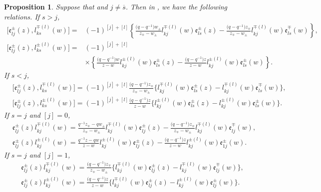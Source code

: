 \documentclass[10pt,a4paper]{amsart}
\numberwithin{equation}{section}
\newtheorem{Proposition}[Theorem]{Proposition}
 { \theoremstyle{definition}
\newtheorem{Definition}[Theorem]{Definition}
\newtheorem{Note}[Theorem]{Note}
\newtheorem{Example}[Theorem]{Example}
\newtheorem{Remark}[Theorem]{Remark} }
\begin{document}
\begin{Proposition}\label{pr3}
Suppose that  and $j\neq \overline{s}$. Then in , we have the following relations.
If $s>j$,
\begin{align}
\bigl[\mathfrak{e}_{lj}^{\pm}(z), l_{ks}^{\mp(l)}(w)\bigr]={}&(-1)^{[j]+[l]}\left\{\frac{\bigl(q-q^{-1}\bigr)w_{\pm}}{z_{\mp}-w_{\pm}}l_{kj}^{\mp(l)}(w)\mathfrak{e}_{ls}^{\pm}(z) -\frac{\bigl(q-q^{-1}\bigr)z_{\mp}}{z_{\mp}-w_{\pm}}l_{kj}^{\mp(l)}(w)\mathfrak{e}_{ls}^{\mp}(w)\right\},\nonumber\\
\bigl[\mathfrak{e}_{lj}^{\pm}(z), l_{ks}^{\pm(l)}(w)\bigr]={}&(-1)^{[j]+[l]}\nonumber\\
&\times\left\{\frac{\bigl(q-q^{-1}\bigr)w}{z-w}l_{kj}^{\pm(l)}(w)\mathfrak{e}_{ls}^{\pm}(z) -\frac{\bigl(q-q^{-1}\bigr)z}{z-w}l_{kj}^{\pm(l)}(w)\mathfrak{e}_{ls}^{\pm}(w)\right\}.\label{GS9}
\end{align}
If $s<j$,
\begin{align*}%
 &\bigl[\mathfrak{e}_{lj}^{\pm}(z), l_{ks}^{\mp(l)}(w)\bigr]=(-1)^{[j]+[l]}\frac{\bigl(q-q^{-1}\bigr)z_{\mp}}{z_{\mp}-w_{\pm}}\bigl\{l_{kj}^{\mp(l)}(w)\mathfrak{e}_{ls}^{\pm}(z) -l_{kj}^{\mp(l)}(w)\mathfrak{e}_{ls}^{\mp}(w)\bigr\},\\
 &\bigl[\mathfrak{e}_{lj}^{\pm}(z), l_{ks}^{\pm(l)}(w)\bigr]=(-1)^{[j]+[l]}\frac{\bigl(q-q^{-1}\bigr)z}{z-w}\bigl\{l_{kj}^{\pm(l)}(w)\mathfrak{e}_{ls}^{\pm}(z) -l_{kj}^{\pm(l)}(w)\mathfrak{e}_{ls}^{\pm}(w)\bigr\}.
\end{align*}
If $s=j$ and $[j]=0$,
\begin{align}
 &\mathfrak{e}_{lj}^{\pm}(z)l_{kj}^{\mp(l)}(w)=\frac{q^{-1}z_{\mp}-qw_{\pm}}{z_{\mp}-w_{\pm}}l_{kj}^{\mp(l)}(w)\mathfrak{e}_{lj}^{\pm}(z) -\frac{\bigl(q-q^{-1}\bigr)z_{\mp}}{z_{\mp}-w_{\pm}}l_{kj}^{\mp(l)}(w)\mathfrak{e}_{lj}^{\mp}(w),\nonumber\\
 &\mathfrak{e}_{lj}^{\pm}(z)l_{kj}^{\pm(l)}(w)=\frac{q^{-1}z-qw}{z-w}l_{kj}^{\pm(l)}(w)\mathfrak{e}_{lj}^{\pm}(z) -\frac{\bigl(q-q^{-1}\bigr)z}{z-w}l_{kj}^{\pm(l)}(w)\mathfrak{e}_{1j}^{\pm}(w).\label{GS11}
\end{align}
If $s=j$ and $[j]=1$,
\begin{align*}%
 &\mathfrak{e}_{lj}^{\pm}(z)l_{kj}^{\mp(l)}(w)=\frac{\bigl(q-q^{-1}\bigr)z_{\mp}}{z_{\mp}-w_{\pm}}\bigl\{l_{kj}^{\mp(l)}(w)\mathfrak{e}_{lj}^{\pm}(z) -l_{kj}^{\mp(l)}(w)\mathfrak{e}_{lj}^{\mp}(w)\bigr\},\\
 &\mathfrak{e}_{lj}^{\pm}(z)l_{kj}^{\pm(l)}(w)=\frac{\bigl(q-q^{-1}\bigr)z}{z-w}\bigl\{l_{kj}^{\mp(l)}(w)\mathfrak{e}_{lj}^{\pm}(z) -l_{kj}^{\pm(l)}(w)\mathfrak{e}_{lj}^{\pm}(w)\bigr\}.
\end{align*}
\end{Proposition}
\end{document}
